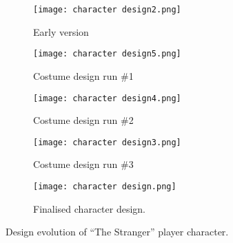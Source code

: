 \begin{figure}
  \centering
  \begin{subfigure}[b]{0.45\textwidth}
    \texttt{[image: character design2.png]}
    \caption{Early version}
  \end{subfigure}
  \begin{subfigure}[b]{0.45\textwidth}
    \texttt{[image: character design5.png]}
    \caption{Costume design run \#1}
  \end{subfigure}
  \begin{subfigure}[b]{0.45\textwidth}
    \texttt{[image: character design4.png]}
    \caption{Costume design run \#2}
  \end{subfigure}
  \begin{subfigure}[b]{0.45\textwidth}
    \texttt{[image: character design3.png]}
    \caption{Costume design run \#3}
  \end{subfigure}
  \begin{subfigure}[b]{0.7\textwidth}
    \texttt{[image: character design.png]}
    \caption{Finalised character design.}
  \end{subfigure}
  \label{fig:designs}
  \caption{Design evolution of ``The Stranger'' player character.}
\end{figure}

